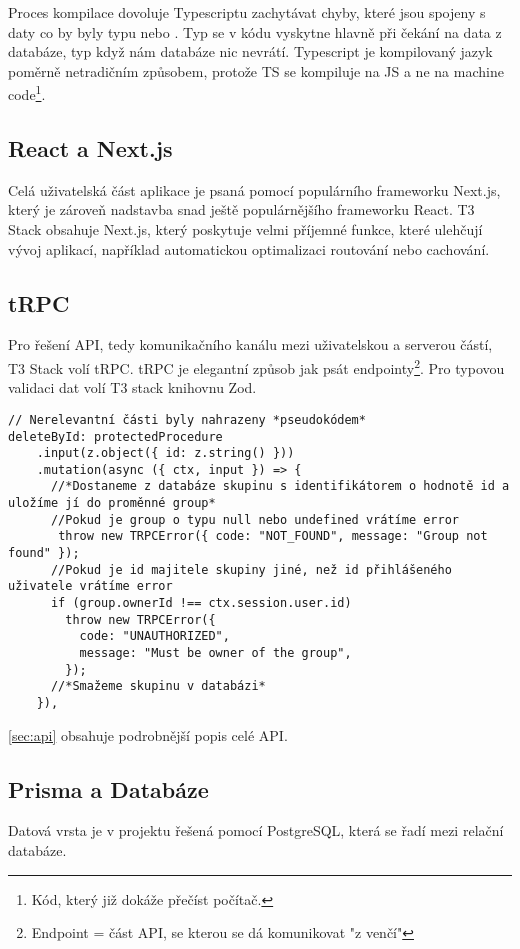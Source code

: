 Proces kompilace dovoluje Typescriptu zachytávat chyby, které jsou spojeny s daty co by byly typu  nebo . Typ  se v kódu vyskytne hlavně při čekání na data z databáze, typ  když nám databáze nic nevrátí.
Typescript je kompilovaný jazyk poměrně netradičním způsobem, protože TS se kompiluje na JS a ne na machine code\footnote{Kód, který již dokáže přečíst počítač.}.

\subsection{React a Next.js}

Celá uživatelská část aplikace je psaná pomocí populárního frameworku Next.js, který je zároveň nadstavba snad ještě populárnějšího frameworku React. T3 Stack obsahuje Next.js, který poskytuje velmi příjemné funkce, které ulehčují vývoj aplikací, například automatickou optimalizaci routování nebo cachování\cite{vercel}.

\subsection{tRPC}
Pro řešení API, tedy komunikačního kanálu mezi uživatelskou a serverou částí, T3 Stack volí tRPC. tRPC je elegantní způsob jak psát endpointy\footnote{Endpoint = část API, se kterou se dá komunikovat "z venčí"}. Pro typovou validaci dat volí T3 stack knihovnu Zod\cite{zod}.
\begin{lstlisting}[caption={Úryvek z "groups" routeru zobrazující mazání skupiny}]
// Nerelevantní části byly nahrazeny *pseudokódem*
deleteById: protectedProcedure
    .input(z.object({ id: z.string() }))
    .mutation(async ({ ctx, input }) => {
      //*Dostaneme z databáze skupinu s identifikátorem o hodnotě id a uložíme jí do proměnné group*
      //Pokud je group o typu null nebo undefined vrátíme error
       throw new TRPCError({ code: "NOT_FOUND", message: "Group not found" });
      //Pokud je id majitele skupiny jiné, než id přihlášeného uživatele vrátíme error
      if (group.ownerId !== ctx.session.user.id)
        throw new TRPCError({
          code: "UNAUTHORIZED",
          message: "Must be owner of the group",
        });
      //*Smažeme skupinu v databázi*
    }),
\end{lstlisting}
\autoref{sec:api} obsahuje podrobnější popis celé API.

\subsection{Prisma a Databáze}
Datová vrsta je v projektu řešená pomocí PostgreSQL, která se řadí mezi relační databáze.

